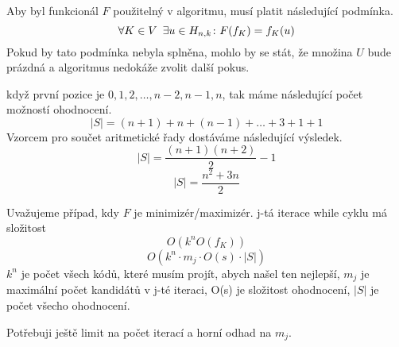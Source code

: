 Aby byl funkcionál $F$ použitelný v algoritmu, musí platit následující podmínka. 
\[\forall K \in V \hspace{5px} \exists u \in H_{n,k} \colon F(f_K) = f_K(u)\]
Pokud by tato podmínka nebyla splněna, mohlo by se stát, že množina $U$ bude prázdná a algoritmus nedokáže zvolit další pokus.


\begin{tvrz}
když první pozice je $0, 1, 2, \dots, n-2, n-1, n$, tak máme následující počet možností ohodnocení.
    \[|S| = (n+1) + n + (n-1)  + \dots + 3 + 1 + 1 \]
Vzorcem pro součet aritmetické řady dostáváme následující výsledek.
    \[|S| = \frac{(n+1)(n+2)}{2} - 1 \]
    \[|S| = \frac{n^2 + 3n}{2}\]
\end{tvrz}

\begin{tvrz}
    Uvažujeme případ, kdy $F$ je minimizér/maximizér.
    j-tá iterace while cyklu má složitost 
    \[O( k^n O(f_K))\]
    \[O( k^n \cdot m_j \cdot O(s) \cdot |S|)\]
    $k^n$ je počet všech kódů, které musím projít, abych našel ten nejlepší, $m_j$ je maximální počet kandidátů v j-té iteraci, O(s) je složitost ohodnocení, $|S|$ je počet všecho ohodnocení.

    Potřebuji ještě limit na počet iterací a horní odhad na $m_j$.
\end{tvrz}


